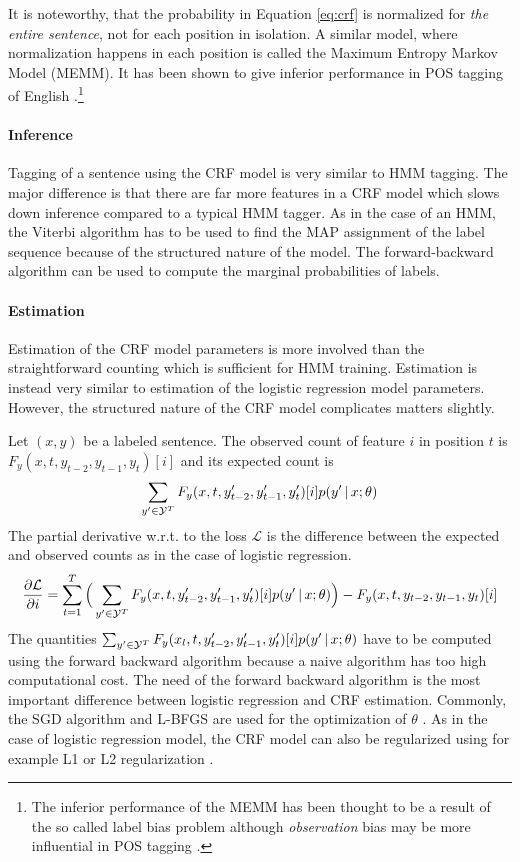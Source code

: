 It is noteworthy, that the probability in Equation \ref{eq:crf} is
normalized for {\it the entire sentence}, not for each position in
isolation. A similar model, where normalization happens in each
position is called the Maximum Entropy Markov Model (MEMM). It has
been shown to give inferior performance in POS tagging of English
\citep{Lafferty2001}.\footnote{The inferior performance of the MEMM
  has been thought to be a result of the so called label bias problem
  \citep{Lafferty2001} although {\it observation} bias may be more
  influential in POS tagging \citep{Klein2002}.}

\paragraph{Inference} Tagging of a sentence using the CRF model is
very similar to HMM tagging. The major difference is that there are
far more features in a CRF model which slows down inference compared
to a typical HMM tagger. As in the case of an HMM, the Viterbi
algorithm has to be used to find the MAP assignment of the label
sequence because of the structured nature of the model. The
forward-backward algorithm can be used to compute the marginal
probabilities of labels.

\paragraph{Estimation} Estimation of the CRF model parameters is more
involved than the straightforward counting which is sufficient for HMM
training. Estimation is instead very similar to estimation of the
logistic regression model parameters. However, the structured nature
of the CRF model complicates matters slightly.

Let $(x, y)$ be a labeled sentence. The observed count of feature $i$ in position $t$ is $F_{y}(x, t, y_{t-2},y_{t-1},y_t)[i]$ and its expected count is
$$\sum_{y' \in \mathcal{Y}^T} F_y(x, t, y_{t - 2}', y_{t-1}', y_t')[i] p(y'\mbox{$ \, | \, $} x \mbox{$ ; \, $} \theta)$$
The partial derivative w.r.t. to the loss $\mathcal{L}$ is the difference between the expected and observed counts as in the case of logistic regression.
$$\frac{\partial\mathcal{L}}{\partial i} = \sum_{t=1}^T \Big( \sum_{y' \in \mathcal{Y}^T} F_y(x, t, y_{t - 2}', y_{t-1}', y_t')[i] p(y'\mbox{$ \, | \, $} x \mbox{$ ; \, $} \theta)\Big) - F_{y}(x, t, y_{t-2},y_{t-1},y_t)[i]$$ 
The quantities $\sum_{y' \in \mathcal{Y}^T} F_y(x_l, t, y_{t - 2}',
y_{t-1}', y_t')[i] p(y'\mbox{$ \, | \, $} x \mbox{$ ; \, $} \theta)$ have to be computed using
the forward backward algorithm because a naive algorithm has too high computational cost. The need of the forward backward algorithm is the
most important difference between logistic regression and CRF estimation.  Commonly,
the SGD algorithm and L-BFGS are used for the optimization of $\theta$
\citep{Vishwanathan2006}. As in the case of logistic regression model, the CRF model
can also be regularized using for example L1 or L2 regularization
\citep{Sutton2012}.

